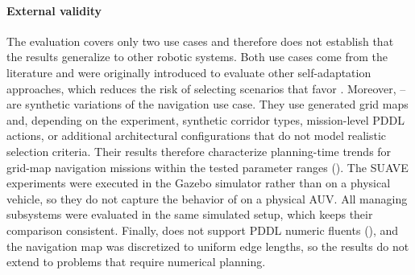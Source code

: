\paragraph{External validity}
The evaluation covers only two use cases and therefore does not establish that the results generalize to other robotic systems. Both use cases come from the literature and were originally introduced to evaluate other self-adaptation approaches, which reduces the risk of selecting scenarios that favor \planta. Moreover, \Sone--\Sfive are synthetic variations of the navigation use case. They use generated grid maps and, depending on the experiment, synthetic corridor types, mission-level PDDL actions, or additional architectural configurations that do not model realistic selection criteria. Their results therefore characterize planning-time trends for grid-map navigation missions within the tested parameter ranges (). The SUAVE experiments were executed in the Gazebo simulator rather than on a physical vehicle, so they do not capture the behavior of \planta on a physical AUV\@. All managing subsystems were evaluated in the same simulated setup, which keeps their comparison consistent. Finally, \planta does not support PDDL numeric fluents (), and the navigation map was discretized to uniform edge lengths, so the results do not extend to problems that require numerical planning.

